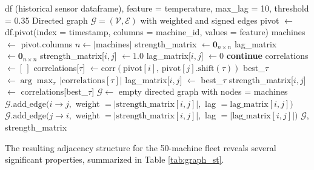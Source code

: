 \begin{algorithm}[!htbp]
\small
\caption{Build Temporal Graph via Cross-Correlation Analysis}
\label{alg:temporal_graph}
\begin{algorithmic}[1]
\Require df (historical sensor dataframe), feature = temperature, max\_lag = 10, threshold = 0.35
\Ensure Directed graph $\mathcal{G} = (\mathcal{V}, \mathcal{E})$ with weighted and signed edges
\State pivot $\gets$ df.pivot(index = timestamp, columns = machine\_id, values = feature)
\State machines $\gets$ pivot.columns
\State $n \gets |$machines$|$
\State strength\_matrix $\gets \mathbf{0}_{n \times n}$
\State lag\_matrix $\gets \mathbf{0}_{n \times n}$
        \State strength\_matrix[$i,j$] $\gets 1.0$
        \State lag\_matrix[$i,j$] $\gets 0$
        \State \textbf{continue}
    \EndIf
    \State correlations $\gets [\,]$
        \State correlations[$\tau$] $\gets \mathrm{corr}(\text{pivot}[i],\, \text{pivot}[j].\text{shift}(\tau))$
    \EndFor
    \State best\_$\tau$ $\gets \arg\max_{\tau}\, |\text{correlations}[\tau]|$
    \State lag\_matrix[$i,j$] $\gets$ best\_$\tau$
    \State strength\_matrix[$i,j$] $\gets$ correlations[best\_$\tau$]
\EndFor
\State $\mathcal{G} \gets$ empty directed graph with nodes = machines
            \State $\mathcal{G}.\text{add\_edge}(i \rightarrow j,$
            \Statex \hspace{2em} weight $= |\text{strength\_matrix}[i,j]|,$
            \Statex \hspace{2em} lag $= \text{lag\_matrix}[i,j])$
            \State $\mathcal{G}.\text{add\_edge}(j \rightarrow i,$
            \Statex \hspace{2em} weight $= |\text{strength\_matrix}[i,j]|,$
            \Statex \hspace{2em} lag $= |\text{lag\_matrix}[i,j]|)$
        \EndIf
    \EndIf
\EndFor
\State \Return $\mathcal{G}$, strength\_matrix
\end{algorithmic}
\end{algorithm}
The resulting adjacency structure for the 50-machine fleet reveals several significant properties, summarized in Table \ref{tab:graph_st}.
